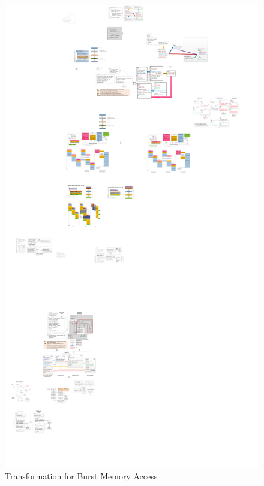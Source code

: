 \begin{figure}[htp]
\begin{center}
\includegraphics[width=1.0\linewidth]{chap3fig/inferburst.pdf}
\caption{Transformation for Burst Memory Access
\label{fig:stream}}
\end{center}
\end{figure}

